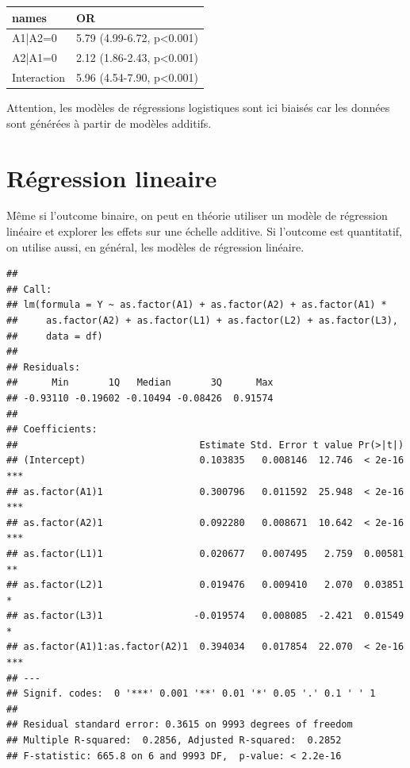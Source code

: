 \documentclass[
]{book}
\begin{document}
\begin{table}
\centering
\begin{tabular}[t]{l|l}
\hline
names & OR\\
\hline
A1|A2=0 & 5.79 (4.99-6.72, p<0.001)\\
\hline
A2|A1=0 & 2.12 (1.86-2.43, p<0.001)\\
\hline
Interaction & 5.96 (4.54-7.90, p<0.001)\\
\hline
\end{tabular}
\end{table}

Attention, les modèles de régressions logistiques sont ici biaisés car les données sont générées à partir de modèles additifs.

\hypertarget{ruxe9gression-lineaire}{%
\section{Régression lineaire}\label{ruxe9gression-lineaire}}

Même si l'outcome binaire, on peut en théorie utiliser un modèle de régression linéaire et explorer les effets sur une échelle additive. Si l'outcome est quantitatif, on utilise aussi, en général, les modèles de régression linéaire.

\begin{verbatim}
## 
## Call:
## lm(formula = Y ~ as.factor(A1) + as.factor(A2) + as.factor(A1) * 
##     as.factor(A2) + as.factor(L1) + as.factor(L2) + as.factor(L3), 
##     data = df)
## 
## Residuals:
##      Min       1Q   Median       3Q      Max 
## -0.93110 -0.19602 -0.10494 -0.08426  0.91574 
## 
## Coefficients:
##                                Estimate Std. Error t value Pr(>|t|)    
## (Intercept)                    0.103835   0.008146  12.746  < 2e-16 ***
## as.factor(A1)1                 0.300796   0.011592  25.948  < 2e-16 ***
## as.factor(A2)1                 0.092280   0.008671  10.642  < 2e-16 ***
## as.factor(L1)1                 0.020677   0.007495   2.759  0.00581 ** 
## as.factor(L2)1                 0.019476   0.009410   2.070  0.03851 *  
## as.factor(L3)1                -0.019574   0.008085  -2.421  0.01549 *  
## as.factor(A1)1:as.factor(A2)1  0.394034   0.017854  22.070  < 2e-16 ***
## ---
## Signif. codes:  0 '***' 0.001 '**' 0.01 '*' 0.05 '.' 0.1 ' ' 1
## 
## Residual standard error: 0.3615 on 9993 degrees of freedom
## Multiple R-squared:  0.2856, Adjusted R-squared:  0.2852 
## F-statistic: 665.8 on 6 and 9993 DF,  p-value: < 2.2e-16
\end{verbatim}
\end{document}

